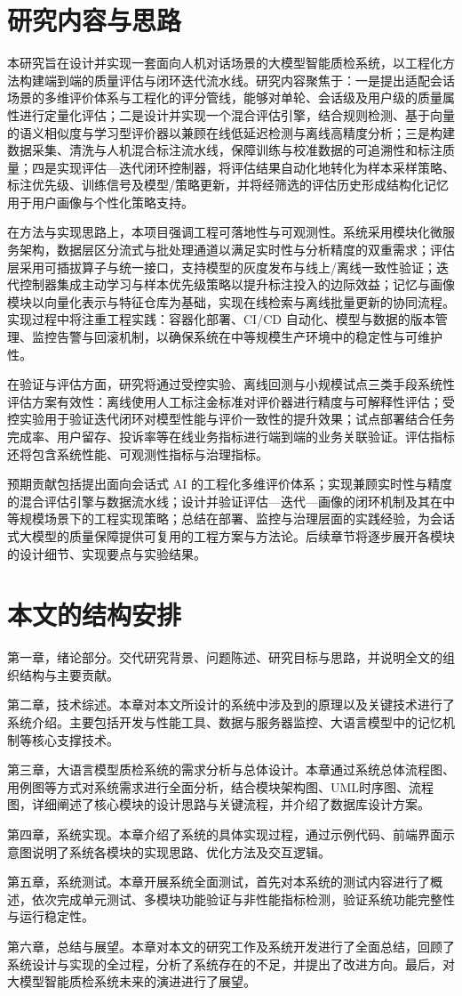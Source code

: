 \section{研究内容与思路}
本研究旨在设计并实现一套面向人机对话场景的大模型智能质检系统，以工程化方法构建端到端的质量评估与闭环迭代流水线。研究内容聚焦于：一是提出适配会话场景的多维评价体系与工程化的评分管线，能够对单轮、会话级及用户级的质量属性进行定量化评估；二是设计并实现一个混合评估引擎，结合规则检测、基于向量的语义相似度与学习型评价器以兼顾在线低延迟检测与离线高精度分析；三是构建数据采集、清洗与人机混合标注流水线，保障训练与校准数据的可追溯性和标注质量；四是实现评估—迭代闭环控制器，将评估结果自动化地转化为样本采样策略、标注优先级、训练信号及模型/策略更新，并将经筛选的评估历史形成结构化记忆用于用户画像与个性化策略支持。

在方法与实现思路上，本项目强调工程可落地性与可观测性。系统采用模块化微服务架构，数据层区分流式与批处理通道以满足实时性与分析精度的双重需求；评估层采用可插拔算子与统一接口，支持模型的灰度发布与线上/离线一致性验证；迭代控制器集成主动学习与样本优先级策略以提升标注投入的边际效益；记忆与画像模块以向量化表示与特征仓库为基础，实现在线检索与离线批量更新的协同流程。实现过程中将注重工程实践：容器化部署、CI/CD 自动化、模型与数据的版本管理、监控告警与回滚机制，以确保系统在中等规模生产环境中的稳定性与可维护性。

在验证与评估方面，研究将通过受控实验、离线回测与小规模试点三类手段系统性评估方案有效性：离线使用人工标注金标准对评价器进行精度与可解释性评估；受控实验用于验证迭代闭环对模型性能与评价一致性的提升效果；试点部署结合任务完成率、用户留存、投诉率等在线业务指标进行端到端的业务关联验证。评估指标还将包含系统性能、可观测性指标与治理指标。

预期贡献包括提出面向会话式 AI 的工程化多维评价体系；实现兼顾实时性与精度的混合评估引擎与数据流水线；设计并验证评估—迭代—画像的闭环机制及其在中等规模场景下的工程实现策略；总结在部署、监控与治理层面的实践经验，为会话式大模型的质量保障提供可复用的工程方案与方法论。后续章节将逐步展开各模块的设计细节、实现要点与实验结果。
\section{本文的结构安排}
第一章，绪论部分。交代研究背景、问题陈述、研究目标与思路，并说明全文的组织结构与主要贡献。

第二章，技术综述。本章对本文所设计的系统中涉及到的原理以及关键技术进行了系统介绍。主要包括开发与性能工具、数据与服务器监控、大语言模型中的记忆机制等核心支撑技术。

第三章，大语言模型质检系统的需求分析与总体设计。本章通过系统总体流程图、用例图等方式对系统需求进行全面分析，结合模块架构图、UML时序图、流程图，详细阐述了核心模块的设计思路与关键流程，并介绍了数据库设计方案。

第四章，系统实现。本章介绍了系统的具体实现过程，通过示例代码、前端界面示意图说明了系统各模块的实现思路、优化方法及交互逻辑。

第五章，系统测试。本章开展系统全面测试，首先对本系统的测试内容进行了概述，依次完成单元测试、多模块功能验证与非性能指标检测，验证系统功能完整性与运行稳定性。

第六章，总结与展望。本章对本文的研究工作及系统开发进行了全面总结，回顾了系统设计与实现的全过程，分析了系统存在的不足，并提出了改进方向。最后，对大模型智能质检系统未来的演进进行了展望。
